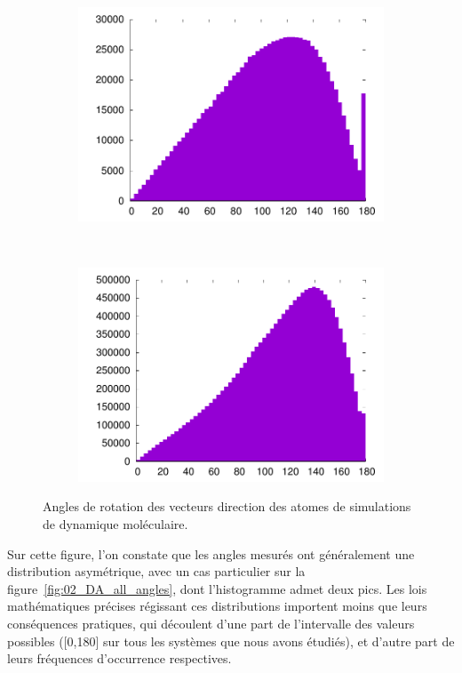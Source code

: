 \begin{figure}[htb]
\begin{subfigure}[t]{\subImgWaStats}
			\includegraphics[width=\textwidth]{figures/ch3/snare_tmd_gg_all_angles}
			\caption{}
			\label{fig:snare_tmd_gg_all_angles}
		\end{subfigure}
		~
		\begin{subfigure}[t]{\subImgWaStats}
			\centering
			\includegraphics[width=\textwidth]{figures/ch3/gk_extension_all_angles}
			\caption{}
			\label{fig:gk_extension_all_angles}
		\end{subfigure}
		\caption[Angles de rotation, dynamique moléculaire]{Angles de rotation des vecteurs direction des atomes de simulations de dynamique moléculaire.}
		\label{fig:dynMolAngles}
	\end{figure}

	Sur cette figure, l'on constate que les angles mesurés ont généralement une distribution asymétrique, avec un cas particulier sur la figure~\ref{fig:02_DA_all_angles}, dont l'histogramme admet deux pics. Les lois mathématiques précises régissant ces distributions importent moins que leurs conséquences pratiques, qui découlent d'une part de l'intervalle des valeurs possibles ([0,180] sur tous les systèmes que nous avons étudiés), et d'autre part de leurs fréquences d'occurrence respectives.
	
